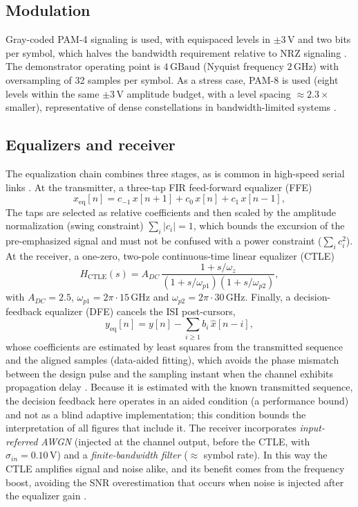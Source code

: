 \documentclass{ieeeaccess}
\begin{document}
\subsection{Modulation}
Gray-coded PAM-4 signaling is used, with equispaced levels in
$\pm 3\,\mathrm{V}$ and two bits per symbol, which halves the bandwidth
requirement relative to NRZ signaling \cite{7964959}. The demonstrator
operating point is $4\,\mathrm{GBaud}$ (Nyquist frequency $2\,\mathrm{GHz}$)
with oversampling of 32 samples per symbol. As a stress case, PAM-8 is used
(eight levels within the same $\pm 3\,\mathrm{V}$ amplitude budget, with a
level spacing $\approx 2.3\times$ smaller), representative of dense
constellations in bandwidth-limited systems \cite{8963973}.

\subsection{Equalizers and receiver}
The equalization chain combines three stages, as is common in high-speed
serial links \cite{10260232,10811094}. At the transmitter, a three-tap FIR
feed-forward equalizer (FFE)
\begin{equation}
x_{\mathrm{eq}}[n] = c_{-1}\,x[n{+}1] + c_{0}\,x[n] + c_{1}\,x[n{-}1],
\label{eq:ffe}
\end{equation}
The taps are selected as relative coefficients and then scaled by the
amplitude normalization (swing constraint) $\sum_i |c_i|=1$, which bounds
the excursion of the pre-emphasized signal and must not be confused with a
power constraint ($\sum_i c_i^2$). At the receiver, a one-zero,
two-pole continuous-time linear equalizer (CTLE) \cite{10873709}
\begin{equation}
H_{\mathrm{CTLE}}(s) = A_{DC}\,\frac{1+s/\omega_z}{(1+s/\omega_{p1})(1+s/\omega_{p2})},
\label{eq:ctle}
\end{equation}
with $A_{DC}=2.5$, $\omega_{p1}=2\pi\!\cdot\!15\,\mathrm{GHz}$ and
$\omega_{p2}=2\pi\!\cdot\!30\,\mathrm{GHz}$. Finally, a decision-feedback
equalizer (DFE) cancels the ISI post-cursors,
\begin{equation}
y_{\mathrm{eq}}[n] = y[n] - \sum_{i\ge 1} b_i\,\hat{x}[n{-}i],
\label{eq:dfe}
\end{equation}
whose coefficients are estimated by least squares from the transmitted
sequence and the aligned samples (data-aided fitting), which avoids the
phase mismatch between the design pulse and the sampling instant when the
channel exhibits propagation delay \cite{11346689}. Because it is estimated
with the known transmitted sequence, the decision feedback here operates in
an aided condition (a performance bound) and not as a blind adaptive
implementation; this condition bounds the interpretation of all figures that
include it. The receiver incorporates \emph{input-referred AWGN} (injected
at the channel output, before the CTLE, with
$\sigma_{in}=0.10\,\mathrm{V}$) and a \emph{finite-bandwidth filter}
($\approx$ symbol rate). In this way the CTLE amplifies signal and noise
alike, and its benefit comes from the frequency boost, avoiding the SNR
overestimation that occurs when noise is injected after the equalizer gain
\cite{9707817}.
\end{document}
